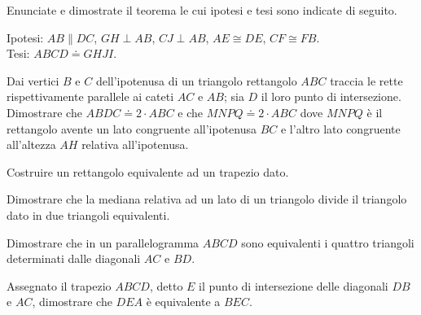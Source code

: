 \begin{multicols}{2}

\begin{esercizio}
\label{ese:7.1}
Enunciate e dimostrate il teorema le cui ipotesi e tesi sono indicate 
di seguito.

\noindent Ipotesi: $AB\parallel DC$, $GH\perp AB$, $CJ\perp AB$, 
$AE\cong DE$, $CF\cong FB$.\\
\noindent Tesi: $ABCD\doteq GHJI$.\\

%
\end{esercizio}
 
\begin{esercizio}
\label{ese:7.2}
Dai vertici $B$ e $C$ dell'ipotenusa di un triangolo rettangolo $ABC$ 
traccia le rette rispettivamente parallele ai cateti $AC$ e $AB$; sia 
$D$ il loro punto di intersezione. Dimostrare che $ABDC\doteq 2\cdot 
ABC$ e che $MNPQ\doteq 2\cdot ABC$ dove $MNPQ$ è il rettangolo avente 
un lato congruente all'ipotenusa $BC$ e l'altro lato congruente 
all'altezza $AH$ relativa all'ipotenusa.
\end{esercizio}

\begin{esercizio}
\label{ese:7.3}
Costruire un rettangolo equivalente ad un trapezio dato.
\end{esercizio}

\begin{esercizio}
\label{ese:7.4}
Dimostrare che la mediana relativa ad un lato di un triangolo divide 
il triangolo dato in due triangoli equivalenti.
\end{esercizio}

\begin{esercizio}
\label{ese:7.5}
Dimostrare che in un parallelogramma $ABCD$ sono equivalenti i 
quattro triangoli determinati dalle diagonali $AC$ e $BD$.
\end{esercizio}

\begin{esercizio}
\label{ese:7.6}
Assegnato il trapezio $ABCD$, detto $E$ il punto di intersezione 
delle diagonali $DB$ e $AC$, dimostrare che $DEA$ è equivalente a 
$BEC$.
\end{esercizio}


\end{multicols}
